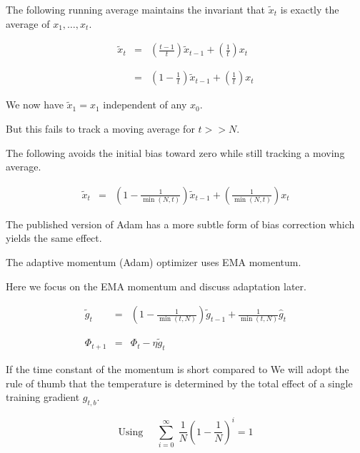 {

The following running average maintains the invariant that $\tilde{x}_t$ is exactly the average of $x_1,\ldots,x_t$.

\begin{eqnarray*}
\tilde{x}_t & = & \left(\frac{t-1}{t}\right)\tilde{x}_{t-1} + \left(\frac{1}{t}\right)x_t \\
\\
\\
& = & \left(1-\frac{1}{t}\right)\tilde{x}_{t-1} + \left(\frac{1}{t}\right)x_t
\end{eqnarray*}

\vfill
We now have $\tilde{x}_1 = x_1$ independent of any $x_0$.

\vfill
But this fails to track a moving average for $t >> N$.


The following avoids the initial bias toward zero while still tracking a moving average.

\begin{eqnarray*}
\tilde{x}_t & = & \left(1-\frac{1}{\min(N,t)}\right)\tilde{x}_{t-1} + \left(\frac{1}{\min(N,t)}\right)x_t
\end{eqnarray*}

\vfill
The published version of Adam has a more subtle form of bias correction which yields the same effect.


The adaptive momentum (Adam) optimizer uses EMA momentum.

\vfill
Here we focus on the EMA momentum and discuss adaptation later.

\vfill
\begin{eqnarray*}
  \tilde{g}_{t} & = & \left(1-\frac{1}{\min(t,N)}\right)\tilde{g}_{t-1} + \frac{1}{\min(t,N)} \hat{g}_t \\
  \\             
  \\
  \Phi_{t+1} & =  & \Phi_t - \eta\tilde{g}_{t}
\end{eqnarray*}


If the time constant of the momentum is short compared to We will adopt the rule of thumb that the temperature is determined by the total effect of a single training gradient $g_{t,b}$.

\vfill

$$\mathrm{Using}\;\;\;\;\; \sum_{i = 0}^\infty \;\frac{1}{N}\left(1 - \frac{1}{N}\right)^i = 1$$

}

